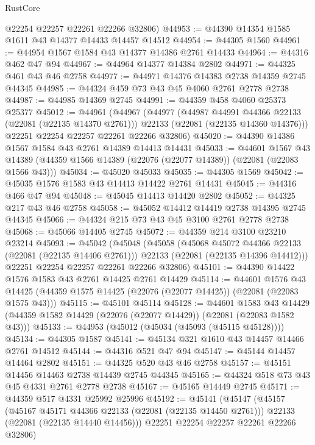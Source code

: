 \begin{lexlean}{RustCore}
\begin{coremodule}
      @22254
      @22257
      @22261
      @22266
      @32806)
@44953 := @44390 @14354 @1585 @1611 @43 @14377 @14433 @14457 @14512
@44954 := @44305 @1560
@44961 := @44954 @1567 @1584 @43 @14377 @14386 @2761 @14433
@44964 := @44316 @462 @47 @94
@44967 := @44964 @14377 @14384 @2802
@44971 := @44325 @461 @43 @46 @2758
@44977 := @44971 @14376 @14383 @2738 @14359 @2745 @44345
@44985 := @44324 @459 @73 @43 @45 @4060 @2761 @2778 @2738
@44987 := @44985 @14369 @2745
@44991 := @44359 @458 @4060 @25373 @25377
@45012 := @44961
    (@44967
      (@44977
        (@44987 @44991 @44366 @22133 (@22081 (@22135 @14370 @2761)))
        @22133
        (@22081 (@22135 @14360 @14376)))
      @22251
      @22254
      @22257
      @22261
      @22266
      @32806)
@45020 := @44390 @14386 @1567 @1584 @43 @2761 @14389 @14413 @14431
@45033 := @44601
    @1567
    @43
    @14389
    (@44359 @1566 @14389 (@22076 (@22077 @14389)) (@22081 (@22083 @1566 @43)))
@45034 := @45020 @45033
@45035 := @44305 @1569
@45042 := @45035 @1576 @1583 @43 @14413 @14422 @2761 @14431
@45045 := @44316 @466 @47 @94
@45048 := @45045 @14413 @14420 @2802
@45052 := @44325 @217 @43 @46 @2758
@45058 := @45052 @14412 @14419 @2738 @14395 @2745 @44345
@45066 := @44324 @215 @73 @43 @45 @3100 @2761 @2778 @2738
@45068 := @45066 @14405 @2745
@45072 := @44359 @214 @3100 @23210 @23214
@45093 := @45042
    (@45048
      (@45058
        (@45068 @45072 @44366 @22133 (@22081 (@22135 @14406 @2761)))
        @22133
        (@22081 (@22135 @14396 @14412)))
      @22251
      @22254
      @22257
      @22261
      @22266
      @32806)
@45101 := @44390 @14422 @1576 @1583 @43 @2761 @14425 @2761 @14429
@45114 := @44601
    @1576
    @43
    @14425
    (@44359 @1575 @14425 (@22076 (@22077 @14425)) (@22081 (@22083 @1575 @43)))
@45115 := @45101 @45114
@45128 := @44601
    @1583
    @43
    @14429
    (@44359 @1582 @14429 (@22076 (@22077 @14429)) (@22081 (@22083 @1582 @43)))
@45133 := @44953 (@45012 (@45034 (@45093 (@45115 @45128))))
@45134 := @44305 @1587
@45141 := @45134 @321 @1610 @43 @14457 @14466 @2761 @14512
@45144 := @44316 @521 @47 @94
@45147 := @45144 @14457 @14464 @2802
@45151 := @44325 @520 @43 @46 @2758
@45157 := @45151 @14456 @14463 @2738 @14439 @2745 @44345
@45165 := @44324 @518 @73 @43 @45 @4331 @2761 @2778 @2738
@45167 := @45165 @14449 @2745
@45171 := @44359 @517 @4331 @25992 @25996
@45192 := @45141
    (@45147
      (@45157
        (@45167 @45171 @44366 @22133 (@22081 (@22135 @14450 @2761)))
        @22133
        (@22081 (@22135 @14440 @14456)))
      @22251
      @22254
      @22257
      @22261
      @22266
      @32806)

\end{coremodule}
\end{lexlean}
